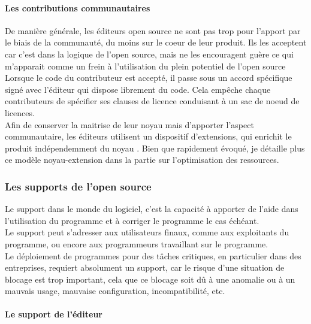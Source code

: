 				\paragraph{Les contributions communautaires\\}

				De manière générale, les éditeurs open source ne sont pas trop pour l'apport par le biais de la communauté, du moins sur le coeur de leur produit. Ils les acceptent car c'est dans la logique de l'open source, mais ne les encouragent guère ce qui m'apparait comme un frein à l'utilisation du plein potentiel de l'open source\\

				Lorsque le code du contributeur est accepté, il passe sous un accord spécifique signé avec l'éditeur qui dispose librement du code. Cela empêche chaque contributeurs de spécifier ses clauses de licence conduisant à un sac de noeud de licences.\\

				Afin de conserver la maitrise de leur noyau mais d'apporter l'aspect communautaire, les éditeurs utilisent un dispositif d'extensions, qui enrichit le produit indépendemment du noyau . Bien que rapidement évoqué, je détaille plus ce modèle noyau-extension dans la partie sur l'optimisation des ressources.

			\subsubsection{Les supports de l'open source}

				Le support dans le monde du logiciel, c'est la capacité à apporter de l'aide dans l'utilisation du programme et à corriger le programme le cas échéant.\\
				
				Le support peut s'adresser aux utilisateurs finaux, comme aux exploitants du programme, ou encore aux programmeurs travaillant sur le programme.\\
				
				Le déploiement de programmes pour des tâches critiques, en particulier dans des entreprises, requiert absolument un support, car le risque d'une situation de blocage est trop important, cela que ce blocage soit dû à une anomalie ou à un mauvais usage, mauvaise configuration, incompatibilité, etc.

				\paragraph{Le support de l'éditeur\\}

